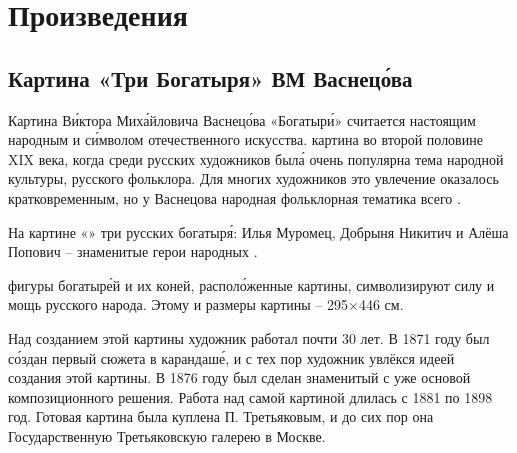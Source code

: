 \section{Произведения}
\subsection{Картина «Три Богатыря» ВМ Васнец\'{о}ва}

Картина В\'{и}ктора Мих\'{а}йловича Васнец\'{о}ва «Богатыр\'{и}»  считается настоящим народным  и с\'{и}мволом отечественного искусства.  картина во второй половине XIX века, когда среди русских художников был\'{а} очень популярна тема народной культуры, русского фольклора. Для многих художников это увлечение оказалось кратковременным, но у Васнецова народная фольклорная тематика   всего .

На картине «»  три русских богатыр\'{я}: Илья Муромец, Добрыня Никитич и Алёша Попович -- знаменитые герои народных .

 фигуры богатыр\'{е}й и их коней, распол\'{о}женные  картины, символизируют силу и мощь русского народа. Этому   и  размеры картины -- 295$\times$446 см.

Над созданием этой картины художник работал почти 30 лет. В 1871 году был с\'{о}здан первый  сюжета в карандаш\'{е}, и с тех пор художник увлёкся идеей создания этой картины. В 1876 году был сделан знаменитый  с уже  основой композиционного решения. Работа над самой картиной длилась с 1881 по 1898 год. Готовая картина была куплена П. Третьяковым, и до сих пор она  Государственную Третьяковскую галерею в Москве.

